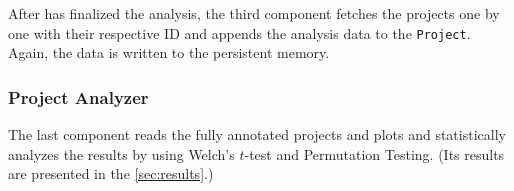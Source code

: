 After \teamscale{} has finalized the analysis, the third component fetches the projects one by one with their respective ID and appends the analysis data to the \texttt{Project}. Again, the data is written to the persistent memory.

\subsubsection{Project Analyzer}

The last component reads the fully annotated projects and plots and statistically analyzes the results by using Welch's $t$-test and Permutation Testing. (Its results are presented in the \autoref{sec:results}.)
